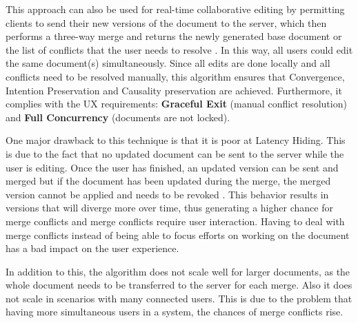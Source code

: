 This approach can also be used for real-time collaborative editing by permitting clients to send their new versions of the document to the server, which then performs a three-way merge and returns the newly generated base document or the list of conflicts that the user needs to resolve \cite[p. 220ff]{minor1993semiasynchronous}. In this way, all users could edit the same document(s) simultaneously. Since all edits are done locally and all conflicts need to be resolved manually, this algorithm ensures that Convergence, Intention Preservation and Causality preservation are achieved. Furthermore, it complies with the UX requirements: \textbf{Graceful Exit} (manual conflict resolution) and \textbf{Full Concurrency} (documents are not locked). 

One major drawback to this technique is that it is poor at Latency Hiding. This is due to the fact that no updated document can be sent to the server while the user is editing. Once the user has finished, an updated version can be sent and merged but if the document has been updated during the merge, the merged version cannot be applied and needs to be revoked \cite[p. 2]{fraser2009differential}. This behavior results in versions that will diverge more over time, thus generating a higher chance for merge conflicts and merge conflicts require user interaction. Having to deal with merge conflicts instead of being able to focus efforts on working on the document has a bad impact on the user experience.

In addition to this, the algorithm does not scale well for larger documents, as the whole document needs to be transferred to the server for each merge. Also it does not scale in scenarios with many connected users. This is due to the problem that having more simultaneous users in a system, the chances of merge conflicts rise.